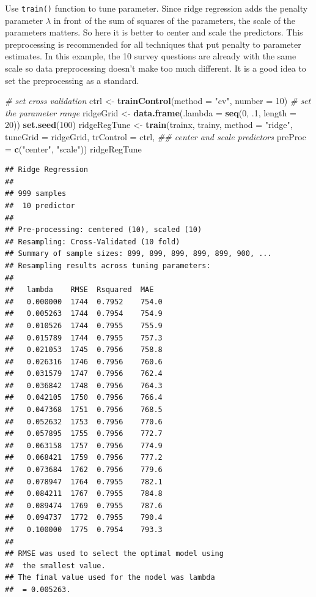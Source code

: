 \documentclass[12pt,]{krantz}
\makeatletter
\newenvironment{Shaded}{\begin{snugshade}}{\end{snugshade}}
\newcommand{\CommentTok}[1]{\textcolor[rgb]{0.37,0.37,0.37}{\textit{#1}}}
\newcommand{\DataTypeTok}[1]{\textcolor[rgb]{0.27,0.27,0.27}{#1}}
\newcommand{\DecValTok}[1]{\textcolor[rgb]{0.06,0.06,0.06}{#1}}
\newcommand{\FloatTok}[1]{\textcolor[rgb]{0.06,0.06,0.06}{#1}}
\newcommand{\KeywordTok}[1]{\textcolor[rgb]{0.27,0.27,0.27}{\textbf{#1}}}
\newcommand{\NormalTok}[1]{#1}
\newcommand{\StringTok}[1]{\textcolor[rgb]{0.5,0.5,0.5}{#1}}
\newenvironment{kframe}{%
\medskip{}
\setlength{\fboxsep}{.8em}
 \def\at@end@of@kframe{}%
 \ifinner\ifhmode%
  \def\at@end@of@kframe{\end{minipage}}%
  \begin{minipage}{\columnwidth}%
 \fi\fi%
 \def\FrameCommand##1{\hskip\@totalleftmargin \hskip-\fboxsep
 \colorbox{shadecolor}{##1}\hskip-\fboxsep
     \hskip-\linewidth \hskip-\@totalleftmargin \hskip\columnwidth}%
 \MakeFramed {\advance\hsize-\width
   \@totalleftmargin\z@ \linewidth\hsize
   \@setminipage}}%
 {\par\unskip\endMakeFramed%
 \at@end@of@kframe}
\renewenvironment{Shaded}{\begin{kframe}}{\end{kframe}}
\makeatother
\begin{document}
Use \texttt{train()} function to tune parameter. Since ridge regression adds the penalty parameter \(\lambda\) in front of the sum of squares of the parameters, the scale of the parameters matters. So here it is better to center and scale the predictors. This preprocessing is recommended for all techniques that put penalty to parameter estimates. In this example, the 10 survey questions are already with the same scale so data preprocessing doesn't make too much different. It is a good idea to set the preprocessing as a standard.

\begin{Shaded}
\begin{Highlighting}[]
\CommentTok{# set cross validation}
\NormalTok{ctrl <-}\StringTok{ }\KeywordTok{trainControl}\NormalTok{(}\DataTypeTok{method =} \StringTok{"cv"}\NormalTok{, }\DataTypeTok{number =} \DecValTok{10}\NormalTok{)}
\CommentTok{# set the parameter range }
\NormalTok{ridgeGrid <-}\StringTok{ }\KeywordTok{data.frame}\NormalTok{(}\DataTypeTok{.lambda =} \KeywordTok{seq}\NormalTok{(}\DecValTok{0}\NormalTok{, }\FloatTok{.1}\NormalTok{, }\DataTypeTok{length =} \DecValTok{20}\NormalTok{))}
\KeywordTok{set.seed}\NormalTok{(}\DecValTok{100}\NormalTok{)}
\NormalTok{ridgeRegTune <-}\StringTok{ }\KeywordTok{train}\NormalTok{(trainx, trainy,}
                      \DataTypeTok{method =} \StringTok{"ridge"}\NormalTok{,}
                      \DataTypeTok{tuneGrid =}\NormalTok{ ridgeGrid,}
                      \DataTypeTok{trControl =}\NormalTok{ ctrl,}
                      \CommentTok{## center and scale predictors}
                      \DataTypeTok{preProc =} \KeywordTok{c}\NormalTok{(}\StringTok{"center"}\NormalTok{, }\StringTok{"scale"}\NormalTok{))}
\NormalTok{ridgeRegTune}
\end{Highlighting}
\end{Shaded}

\begin{verbatim}
## Ridge Regression 
## 
## 999 samples
##  10 predictor
## 
## Pre-processing: centered (10), scaled (10) 
## Resampling: Cross-Validated (10 fold) 
## Summary of sample sizes: 899, 899, 899, 899, 899, 900, ... 
## Resampling results across tuning parameters:
## 
##   lambda    RMSE  Rsquared  MAE  
##   0.000000  1744  0.7952    754.0
##   0.005263  1744  0.7954    754.9
##   0.010526  1744  0.7955    755.9
##   0.015789  1744  0.7955    757.3
##   0.021053  1745  0.7956    758.8
##   0.026316  1746  0.7956    760.6
##   0.031579  1747  0.7956    762.4
##   0.036842  1748  0.7956    764.3
##   0.042105  1750  0.7956    766.4
##   0.047368  1751  0.7956    768.5
##   0.052632  1753  0.7956    770.6
##   0.057895  1755  0.7956    772.7
##   0.063158  1757  0.7956    774.9
##   0.068421  1759  0.7956    777.2
##   0.073684  1762  0.7956    779.6
##   0.078947  1764  0.7955    782.1
##   0.084211  1767  0.7955    784.8
##   0.089474  1769  0.7955    787.6
##   0.094737  1772  0.7955    790.4
##   0.100000  1775  0.7954    793.3
## 
## RMSE was used to select the optimal model using
##  the smallest value.
## The final value used for the model was lambda
##  = 0.005263.
\end{verbatim}
\end{document}
